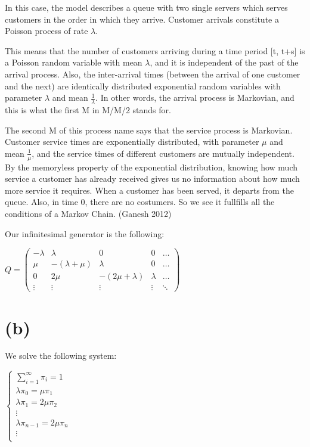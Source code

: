 \documentclass[]{article}
\begin{document}
In this case, the model describes a queue with two single servers which
serves customers in the order in which they arrive. Customer arrivals
constitute a Poisson process of rate \(\lambda\).

This means that the number of customers arriving during a time period
{[}t, t+s{]} is a Poisson random variable with mean \(\lambda\), and it
is independent of the past of the arrival process. Also, the
inter-arrival times (between the arrival of one customer and the next)
are identically distributed exponential random variables with parameter
\(\lambda\) and mean \(\frac{1}{\lambda}\). In other words, the arrival
process is Markovian, and this is what the first M in M/M/2 stands for.

The second M of this process name says that the service process is
Markovian. Customer service times are exponentially distributed, with
parameter \(\mu\) and mean \(\frac{1}{\mu}\), and the service times of
different customers are mutually independent. By the memoryless property
of the exponential distribution, knowing how much service a customer has
already received gives us no information about how much more service it
requires. When a customer has been served, it departs from the queue.
Also, in time 0, there are no costumers. So we see it fullfills all the
conditions of a Markov Chain. (Ganesh 2012)

Our infinitesimal generator is the following:

\(Q = \begin{pmatrix} - \lambda & \lambda & 0 & 0 & \dots \\ \mu & - (\lambda + \mu) & \lambda & 0 & \dots \\ 0 & 2 \mu & - (2 \mu + \lambda) & \lambda & \dots \\ \vdots & \vdots & \vdots & \vdots & \ddots \end{pmatrix}\)

\hypertarget{b-1}{%
\section{(b)}\label{b-1}}

We solve the following system:

\(\begin{cases} \sum_{i = 1}^{\infty} \pi_i = 1 \\ \lambda \pi_0 = \mu \pi_1 \\ \lambda \pi_1 = 2 \mu \pi_2 \\ \vdots \\ \lambda \pi_{n-1} = 2 \mu \pi_n \\ \vdots \\ \end{cases}\)
\end{document}
